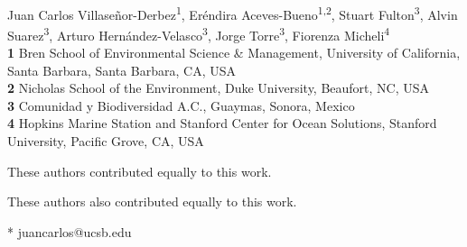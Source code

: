 \documentclass[10pt,letterpaper]{article}
\date{}
\begin{document}
\vspace*{0.2in}

\begin{flushleft}
{\Large
\textbf{} %
}
\newline
\\
Juan Carlos Villaseñor-Derbez\textsuperscript{1\Yinyang*},
Eréndira Aceves-Bueno\textsuperscript{1,2\Yinyang},
Stuart Fulton\textsuperscript{3\ddag},
Alvin Suarez\textsuperscript{3\ddag},
Arturo Hernández-Velasco\textsuperscript{3\ddag},
Jorge Torre\textsuperscript{3\ddag},
Fiorenza Micheli\textsuperscript{4\ddag}
\\
\bigskip
\textbf{1} Bren School of Environmental Science \& Management, University of California, Santa Barbara, Santa Barbara, CA, USA
\\
\textbf{2} Nicholas School of the Environment, Duke University, Beaufort, NC, USA
\\
\textbf{3} Comunidad y Biodiversidad A.C., Guaymas, Sonora, Mexico
\\
\textbf{4} Hopkins Marine Station and Stanford Center for Ocean Solutions, Stanford University, Pacific Grove, CA, USA
\\
\bigskip

% 
%
\Yinyang These authors contributed equally to this work.

\ddag These authors also contributed equally to this work.




* juancarlos@ucsb.edu

\end{flushleft}
\end{document}
